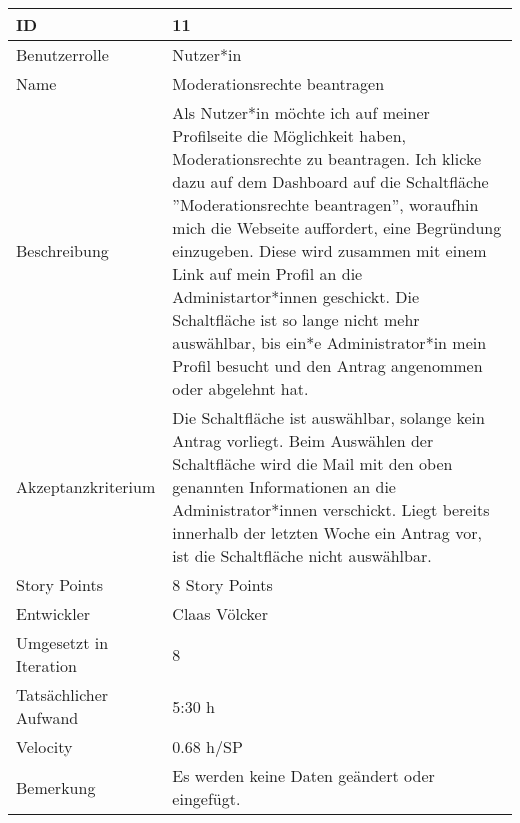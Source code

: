 \begin{tabularx}{\textwidth}{|p{}|X|}
	\hline
	ID & 11\\
	\hline
	Benutzerrolle & Nutzer*in\\
	\hline
	Name & Moderationsrechte beantragen\\
	\hline
	Beschreibung & Als Nutzer*in möchte ich auf meiner Profilseite die Möglichkeit haben, Moderationsrechte zu beantragen. Ich klicke dazu auf dem Dashboard auf die Schaltfläche ''Moderationsrechte beantragen'', woraufhin mich die Webseite auffordert, eine Begründung einzugeben. Diese wird zusammen mit einem Link auf mein Profil an die Administartor*innen geschickt. Die Schaltfläche ist so lange nicht mehr auswählbar, bis ein*e Administrator*in mein Profil besucht und den Antrag angenommen oder abgelehnt hat.\\
	\hline
	Akzeptanzkriterium & Die Schaltfläche ist auswählbar, solange kein Antrag vorliegt. Beim Auswählen der Schaltfläche wird die Mail mit den oben genannten Informationen an die Administrator*innen verschickt. Liegt bereits innerhalb der letzten Woche ein Antrag vor, ist die Schaltfläche nicht auswählbar.\\
	\hline
	Story Points & 8 Story Points\\
	\hline
	Entwickler & Claas Völcker\\
	\hline
	Umgesetzt in Iteration & 8\\
	\hline
	Tatsächlicher Aufwand & 5:30 h\\
	\hline
	Velocity & 0.68 h/SP\\
	\hline
	Bemerkung & Es werden keine Daten geändert oder eingefügt.\\
	\hline
\end{tabularx}
\vspace{20pt}
